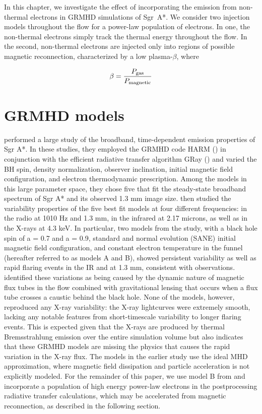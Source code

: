 In this chapter, we investigate the effect of incorporating the emission from non-thermal electrons in GRMHD
simulations of Sgr~A*. We consider two injection models
throughout the flow for a power-law population of electrons. In one, the non-thermal electrons simply track
the thermal energy throughout the flow. In the second,
non-thermal electrons are injected only into regions of
possible magnetic reconnection, characterized by a low
plasma-$\beta$, where


\begin{equation}
	\beta = \frac{P_{\rm{gas}}}{P_{\rm{magnetic}}}
\end{equation}
\section{GRMHD models}
\citet{chan2015b} performed a large study of
the broadband, time-dependent emission properties of
Sgr A*. In these studies, they employed the GRMHD
code HARM (\citealt{gammie2003, narayan2012})
in conjunction with the efficient radiative transfer algorithm GRay (\citealt{chan2013}) and varied the BH spin,
density normalization, observer inclination, initial magnetic field configuration, and electron thermodynamic
prescription. Among the models in this large parameter
space, they chose five that fit the steady-state broadband
spectrum of Sgr A* and its observed 1.3 mm image size.
\citet{chan2015b} then studied the variability properties of the five best fit models at four different frequencies: in the radio at 1010 Hz and 1.3 mm, in the infrared
at 2.17 microns, as well as in the X-rays at 4.3 keV.
In particular, two models from the study, with a black
hole spin of a = 0.7 and a = 0.9, standard and normal evolution (SANE) initial magnetic field configuration, and constant electron temperature in the funnel
(hereafter referred to as models A and B), showed persistent variability as well as rapid flaring events in the
IR and at 1.3 mm, consistent with observations. \citet{chan2015b} identified these variations as being caused
by the dynamic nature of magnetic flux tubes in the flow
combined with gravitational lensing that occurs when a
flux tube crosses a caustic behind the black hole. None
of the models, however, reproduced any X-ray variability: the X-ray lightcurves were extremely smooth, lacking any notable features from short-timescale variability
to longer flaring events. This is expected given that the
X-rays are produced by thermal Bremsstrahlung emission over the entire simulation volume but also indicates
that these GRMHD models are missing the physics that
causes the rapid variation in the X-ray flux.
The models in the earlier study use the ideal MHD approximation, where magnetic field dissipation and particle acceleration is not explicitly modeled. For the
remainder of this paper, we use model B from \citet{chan2015a} and incorporate a population of high energy power-law electrons in the postprocessing radiative transfer calculations, which may be accelerated from
magnetic reconnection, as described in the following section.
